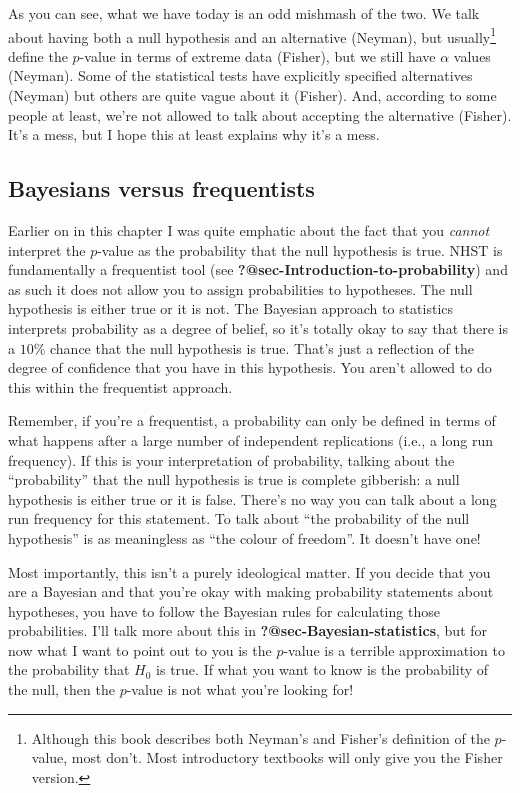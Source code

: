 \documentclass[
  a4paper,
]{book}
\begin{document}
As you can see, what we have today is an odd mishmash of the two. We
talk about having both a null hypothesis and an alternative (Neyman),
but usually\footnote{Although this book describes both Neyman's and
  Fisher's definition of the \(p\)-value, most don't. Most introductory
  textbooks will only give you the Fisher version.} define the
\(p\)-value in terms of extreme data (Fisher), but we still have
\(\alpha\) values (Neyman). Some of the statistical tests have
explicitly specified alternatives (Neyman) but others are quite vague
about it (Fisher). And, according to some people at least, we're not
allowed to talk about accepting the alternative (Fisher). It's a mess,
but I hope this at least explains why it's a mess.

\subsection{Bayesians versus
frequentists}\label{bayesians-versus-frequentists}

Earlier on in this chapter I was quite emphatic about the fact that you
\emph{cannot} interpret the \(p\)-value as the probability that the null
hypothesis is true. NHST is fundamentally a frequentist tool (see
\textbf{?@sec-Introduction-to-probability}) and as such it does not
allow you to assign probabilities to hypotheses. The null hypothesis is
either true or it is not. The Bayesian approach to statistics interprets
probability as a degree of belief, so it's totally okay to say that
there is a \(10\%\) chance that the null hypothesis is true. That's just
a reflection of the degree of confidence that you have in this
hypothesis. You aren't allowed to do this within the frequentist
approach.

Remember, if you're a frequentist, a probability can only be defined in
terms of what happens after a large number of independent replications
(i.e., a long run frequency). If this is your interpretation of
probability, talking about the ``probability'' that the null hypothesis
is true is complete gibberish: a null hypothesis is either true or it is
false. There's no way you can talk about a long run frequency for this
statement. To talk about ``the probability of the null hypothesis'' is
as meaningless as ``the colour of freedom''. It doesn't have one!

Most importantly, this isn't a purely ideological matter. If you decide
that you are a Bayesian and that you're okay with making probability
statements about hypotheses, you have to follow the Bayesian rules for
calculating those probabilities. I'll talk more about this in
\textbf{?@sec-Bayesian-statistics}, but for now what I want to point out
to you is the \(p\)-value is a terrible approximation to the probability
that \(H_0\) is true. If what you want to know is the probability of the
null, then the \(p\)-value is not what you're looking for!
\end{document}
